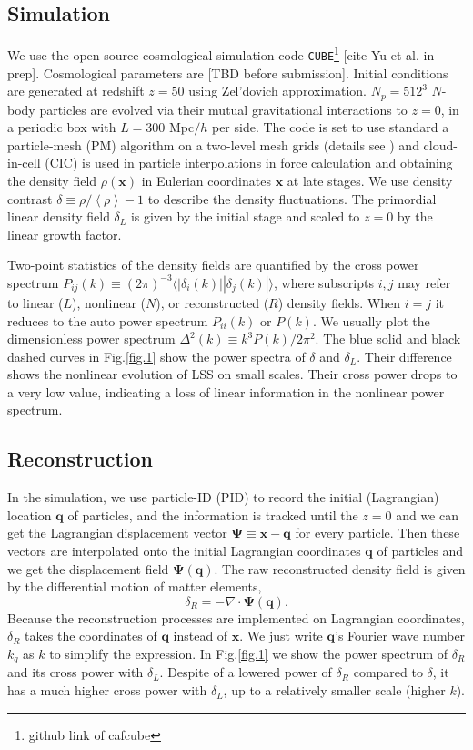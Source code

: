 \documentclass[aps,prd,twocolumn,superscriptaddress,amsfont,amssymb,amsmath,nofootinbib,showpacs,balancelastpage]{revtex4-1}
\newcommand{\bs}{\boldsymbol}
\newcommand{\lb}{\left\langle}
\newcommand{\rb}{\right\rangle}
\begin{document}
\subsection{Simulation}\label{ss.sim}
We use the open source cosmological simulation code {\tt CUBE}\footnote{github link of cafcube}
[cite Yu et al. in prep].
Cosmological parameters 
are [TBD before submission]. Initial conditions are generated at redshift $z=50$ 
using Zel'dovich approximation. $N_p=512^3$ $N$-body particles are evolved via 
their mutual gravitational interactions to $z=0$, in a periodic box with $L=300$ 
Mpc$/h$ per side. The code is set to use standard a particle-mesh (PM) algorithm 
\cite{1988csup.book.....H} on a two-level mesh grids
(details see \cite{2013MNRAS.436..540H}) and cloud-in-cell
(CIC) is used in particle interpolations in force 
calculation and obtaining the density field $\rho({\bs x})$ in Eulerian coordinates 
${\bs x}$ at late stages. We use density contrast $\delta\equiv\rho/\lb\rho\rb-1$ 
to describe the density fluctuations. The primordial linear density field $
\delta_L$ is given by the initial stage and scaled to $z=0$ by the linear growth 
factor.

Two-point statistics of the density fields are quantified by the cross power 
spectrum $P_{ij}(k)\equiv(2\pi)^{-3}\langle|\delta_i(k)||\delta_j(k)|\rangle$, 
where subscripts $i,j$ may refer to linear ($L$), nonlinear ($N$), or reconstructed ($R$) density 
fields. When $i=j$ it reduces to the auto power spectrum $P_{ii}(k)$ or $P(k)$. We 
usually plot the dimensionless power spectrum $\Delta^2(k)\equiv k^3P(k)/2\pi^2$. 
The blue solid and black dashed curves in Fig.\ref{fig.1} show the power spectra of 
$\delta$ and $\delta_L$. Their difference shows the nonlinear evolution of LSS on 
small scales. Their cross power drops to a very low value, indicating a loss of 
linear information in the nonlinear power spectrum.

\subsection{Reconstruction}\label{ss.reco}
In the simulation, we use particle-ID (PID) to record the initial (Lagrangian) location ${\bs 
q}$ of particles, and the information is tracked until the $z=0$ and we can get the 
Lagrangian displacement vector ${\bs \Psi}\equiv{\bs x}-{\bs q}$ for every 
particle. Then these vectors are interpolated onto the initial Lagrangian 
coordinates ${\bs q}$ of particles and we get the displacement field ${\bs \Psi}
({\bs q})$.
The raw reconstructed density field is given by the differential motion of matter 
elements,
\begin{equation}
    \delta_R=-\nabla\cdot{\bs \Psi}({\bs q}).
\end{equation}
Because the reconstruction processes are implemented on Lagrangian coordinates,
$\delta_R$ takes the coordinates of $\bs q$ instead of $\bs x$.
We just write $\bs q$'s Fourier wave number
$k_q$ as $k$ to simplify the expression.
In Fig.\ref{fig.1} we show the power spectrum of $\delta_R$ and its cross power with $\delta_L$. Despite of a lowered power of $\delta_R$ compared to $\delta$, it has a much higher cross power with $\delta_L$, up to a relatively smaller scale (higher $k$).
\end{document}
